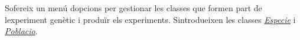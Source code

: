 S\textquotesingle{}ofereix un menú d\textquotesingle{}opcions per gestionar les classes que formen part de l\textquotesingle{}experiment genètic i produïr els experiments. S\textquotesingle{}introdueixen les classes {\itshape \hyperlink{class_especie}{Especie}} i {\itshape \hyperlink{class_poblacio}{Poblacio}}. 